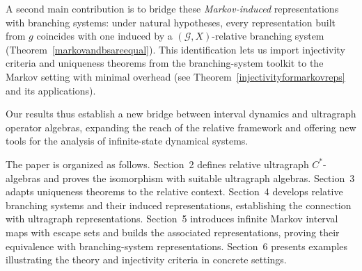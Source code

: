 \documentclass[12pt, reqno]{amsart}
\theoremstyle{definition}
\theoremstyle{remark}
\numberwithin{equation}{section}
\begin{document}
A second main contribution is to bridge these \emph{Markov-induced} representations with branching systems: under natural hypotheses, every representation built from $g$ coincides with one induced by a $(\mathcal{G},X)$-relative branching system (Theorem~\ref{markovandbsareequal}). This identification lets us import injectivity criteria and uniqueness theorems from the branching-system toolkit to the Markov setting with minimal overhead (see Theorem~\ref{injectivityformarkovreps} and its applications).

Our results thus establish a new bridge between interval dynamics and ultragraph operator algebras, expanding the reach of the relative framework and offering new tools for the analysis of infinite-state dynamical systems.

The paper is organized as follows.
Section~2 defines relative ultragraph $C^*$-algebras and proves the isomorphism with suitable ultragraph algebras. Section~3 adapts uniqueness theorems to the relative context. Section~4 develops relative branching systems and their induced representations, establishing the connection with ultragraph representations. Section~5 introduces infinite Markov interval maps with escape sets and builds the associated representations, proving their equivalence with branching-system representations. Section~6 presents examples illustrating the theory and injectivity criteria in concrete settings.




    


\end{document}
